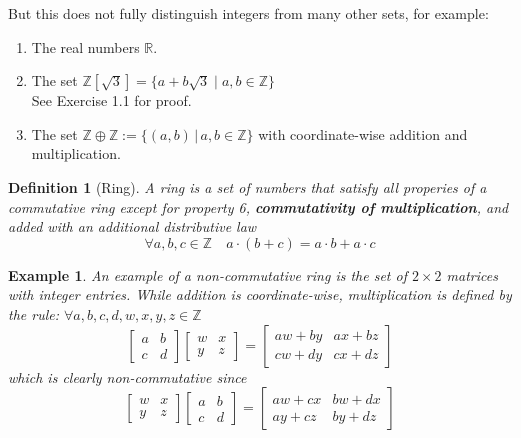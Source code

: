 \documentclass[11pt, oneside]{book}
\theoremstyle{break}
\newtheorem{defn}{Definition}[section]
\newtheorem{eg}{Example}[section]
\newcommand{\bb}[1]{\mathbb{#1}}			%
\begin{document}
But this does not fully distinguish integers from many other sets, for example:
\begin{enumerate}
	\item The real numbers $\bb{R}$.
	\item The set $\bb{Z}[\sqrt{3}] = \{a + b\sqrt{3} \; | \; a, b \in \bb{Z}\}$ \\
		See Exercise 1.1 for proof.
	\item The set $\bb{Z} \oplus \bb{Z} := \{(a, b) \, | \, a, b \in \bb{Z}\}$ with coordinate-wise addition and multiplication.
\end{enumerate}

\begin{defn}[Ring]
	A ring is a set of numbers that satisfy all properies of a commutative ring except for property 6, \textbf{commutativity of multiplication}, and added with an additional distributive law
	\begin{equation*}
		\forall a, b, c \in \bb{Z} \quad a \cdot (b + c) = a \cdot b + a \cdot c
	\end{equation*}
\end{defn}

\begin{eg}
	An example of a non-commutative ring is the set of $2 \times 2$ matrices with integer entries. While addition is coordinate-wise, multiplication is defined by the rule: $\forall a, b, c, d, w, x, y, z \in \bb{Z}$
	\begin{equation*}
		\begin{bmatrix}
			a & b \\
			c & d
		\end{bmatrix}
		\begin{bmatrix}
			w & x \\
			y & z
		\end{bmatrix}
		=
		\begin{bmatrix}
			aw + by & ax + bz \\
			cw + dy & cx + dz
		\end{bmatrix}
	\end{equation*}
	which is clearly non-commutative since
	\begin{equation*}
		\begin{bmatrix}
			w & x \\
			y & z
		\end{bmatrix}
		\begin{bmatrix}
			a & b \\
			c & d
		\end{bmatrix}
		=
		\begin{bmatrix}
			aw + cx & bw + dx \\
			ay + cz & by + dz
		\end{bmatrix}
	\end{equation*}
\end{eg}
\end{document}
